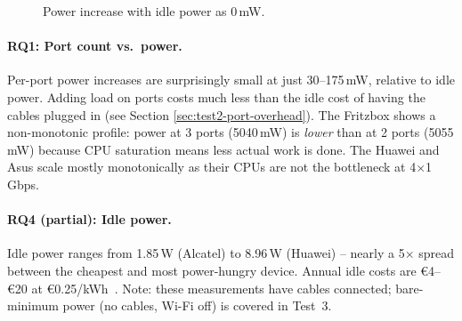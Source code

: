 \begin{figure}[H]
    \centering
    \caption{Power increase with idle power as 0\,mW.}
    \label{fig:power_delta_comparison}
\end{figure}

\paragraph{RQ1: Port count vs.\ power.}
Per-port power increases are surprisingly small at just 30--175\,mW, relative to idle power. Adding load on ports costs much less than the idle cost of having the cables plugged in (see Section \ref{sec:test2-port-overhead}).
The Fritzbox shows a non-monotonic profile: power at 3 ports (5040\,mW) is \emph{lower} than at 2 ports (5055\,mW) because \ac{CPU} saturation means less actual work is done.
The Huawei and Asus scale mostly monotonically as their CPUs are not the bottleneck at 4$\times$1\,Gbps.

\paragraph{RQ4 (partial): Idle power.}
Idle power ranges from 1.85\,W (Alcatel) to 8.96\,W (Huawei) -- nearly a 5$\times$ spread between the cheapest and most power-hungry device.
Annual idle costs are \euro{4}--\euro{20} at \euro{0.25}/kWh~\cite{bib:eurostat-electricity}.
Note: these measurements have cables connected; bare-minimum power (no cables, Wi-Fi off) is covered in Test~3.


